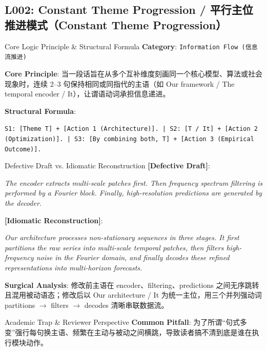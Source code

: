 \subsection{L002: Constant Theme Progression / 平行主位推进模式（Constant Theme Progression）}\label{sec:logic:L002}
\begin{ConceptBox}{Core Logic Principle \& Structural Formula}
\textbf{Category}: \texttt{Information Flow (信息流推进)}\par\vspace{3pt}
\textbf{Core Principle}: 当一段话旨在从多个互补维度刻画同一个核心模型、算法或社会现象时，连续 2--3 句保持相同或同指代的主语（如 Our framework / The temporal encoder / It），让谓语动词承担信息递进。\par\vspace{4pt}
\textbf{Structural Formula}:\par\noindent\texttt{S1: [Theme T] + [Action 1 (Architecture)]. | S2: [T / It] + [Action 2 (Optimization)]. | S3: [By combining both, T] + [Action 3 (Empirical Outcome)].}
\end{ConceptBox}
\begin{ExampleBox}{Defective Draft vs. Idiomatic Reconstruction}
\textbf{\color{TargetHighlight}[Defective Draft]}:\par\textit{The encoder extracts multi-scale patches first. Then frequency spectrum filtering is performed by a Fourier block. Finally, high-resolution predictions are generated by the decoder.}\par\vspace{4pt}
\textbf{\color{AcadNavy}[Idiomatic Reconstruction]}:\par\textit{Our architecture processes non-stationary sequences in three stages. It first partitions the raw series into multi-scale temporal patches, then filters high-frequency noise in the Fourier domain, and finally decodes these refined representations into multi-horizon forecasts.}\par\vspace{4pt}
\textbf{Surgical Analysis}: 修改前主语在 encoder、filtering、predictions 之间无序跳转且混用被动语态；修改后以 Our architecture / It 为统一主位，用三个并列强动词 partitions $\to$ filters $\to$ decodes 清晰串联数据流。
\end{ExampleBox}
\begin{TipBox}{Academic Trap \& Reviewer Perspective}
\textbf{Common Pitfall}: 为了所谓“句式多变”强行每句换主语、频繁在主动与被动之间横跳，导致读者搞不清到底是谁在执行模块动作。
\end{TipBox}
\vspace{6pt}
